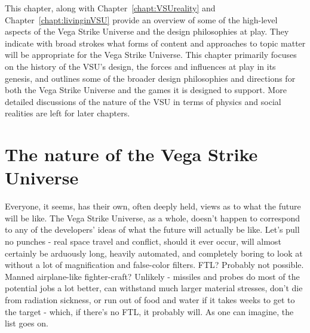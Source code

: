 \label{chapt:overview}
This chapter, along with Chapter~\ref{chapt:VSUreality} and
Chapter~\ref{chapt:livinginVSU} provide an overview of some of the
high-level aspects of the Vega Strike Universe and the design
philosophies at play. They indicate with broad strokes what forms of
content and approaches to topic matter will be appropriate for the
Vega Strike Universe. This chapter primarily focuses on the history of
the VSU's design, the forces and influences at play in its genesis,
and outlines some of the broader design philosophies and directions
for both the Vega Strike Universe and the games it is designed to
support. More detailed discussions of the nature of the VSU in terms
of physics and social realities are left for later chapters.


\section{The nature of the Vega Strike Universe}
\label{sec:VSUflavor}
Everyone, it seems, has their own, often deeply held, views as to what
the future will be like. The Vega Strike Universe, as a whole, doesn't
happen to correspond to any of the developers' ideas of what the future
will actually be like. Let's pull no punches - real space travel and
conflict, should it ever occur, will almost certainly be arduously
long, heavily automated, and completely boring to look at without a
lot of magnification and false-color filters. FTL? Probably not
possible. Manned airplane-like fighter-craft? Unlikely - missiles and
probes do most of the potential jobs a lot better, can withstand much
larger material stresses, don't die from radiation sickness, or run
out of food and water if it takes weeks to get to the target - which,
if there's no FTL, it probably will. As one can imagine, the list goes
on.

